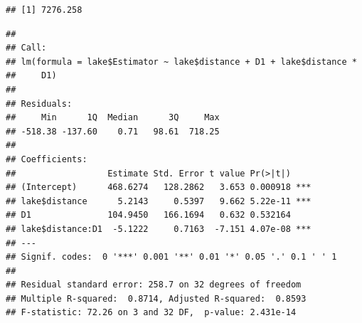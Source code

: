 \documentclass[]{article}
\newenvironment{Shaded}{\begin{snugshade}}{\end{snugshade}}
\newcommand{\KeywordTok}[1]{\textcolor[rgb]{0.13,0.29,0.53}{\textbf{#1}}}
\newcommand{\DataTypeTok}[1]{\textcolor[rgb]{0.13,0.29,0.53}{#1}}
\newcommand{\DecValTok}[1]{\textcolor[rgb]{0.00,0.00,0.81}{#1}}
\newcommand{\StringTok}[1]{\textcolor[rgb]{0.31,0.60,0.02}{#1}}
\newcommand{\CommentTok}[1]{\textcolor[rgb]{0.56,0.35,0.01}{\textit{#1}}}
\newcommand{\OperatorTok}[1]{\textcolor[rgb]{0.81,0.36,0.00}{\textbf{#1}}}
\newcommand{\NormalTok}[1]{#1}
\begin{document}
\begin{Shaded}
\end{Shaded}

\begin{verbatim}
## [1] 7276.258
\end{verbatim}

\begin{Shaded}
\end{Shaded}

\begin{verbatim}
## 
## Call:
## lm(formula = lake$Estimator ~ lake$distance + D1 + lake$distance * 
##     D1)
## 
## Residuals:
##     Min      1Q  Median      3Q     Max 
## -518.38 -137.60    0.71   98.61  718.25 
## 
## Coefficients:
##                  Estimate Std. Error t value Pr(>|t|)    
## (Intercept)      468.6274   128.2862   3.653 0.000918 ***
## lake$distance      5.2143     0.5397   9.662 5.22e-11 ***
## D1               104.9450   166.1694   0.632 0.532164    
## lake$distance:D1  -5.1222     0.7163  -7.151 4.07e-08 ***
## ---
## Signif. codes:  0 '***' 0.001 '**' 0.01 '*' 0.05 '.' 0.1 ' ' 1
## 
## Residual standard error: 258.7 on 32 degrees of freedom
## Multiple R-squared:  0.8714, Adjusted R-squared:  0.8593 
## F-statistic: 72.26 on 3 and 32 DF,  p-value: 2.431e-14
\end{verbatim}
\end{document}
